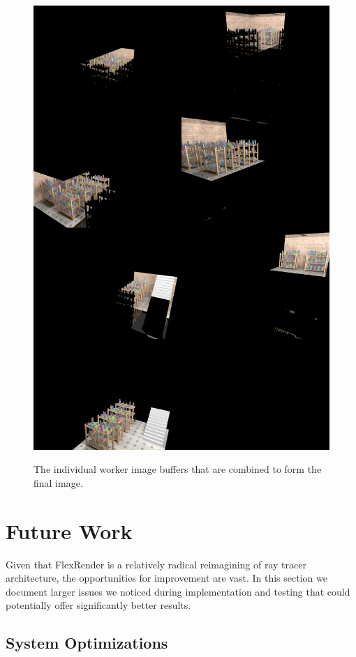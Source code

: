 \documentclass[12pt]{ucthesis}
\newcommand{\captionfonts}{\small\bf\ssp}
\begin{document}
\begin{figure}[h!]
    \centering
    \includegraphics[width=120mm]{images/toystoredistribution.png}
    \captionfonts
    \caption{The individual worker image buffers that are combined to form the final image.}
    \label{fig:toystoredist}
\end{figure}

\chapter{Future Work}
\label{futurework}

Given that FlexRender is a relatively radical reimagining of ray tracer
architecture, the opportunities for improvement are vast. In this section we
document larger issues we noticed during implementation and testing that
could potentially offer significantly better results.

\section{System Optimizations}
\label{optimizations}
\end{document}
